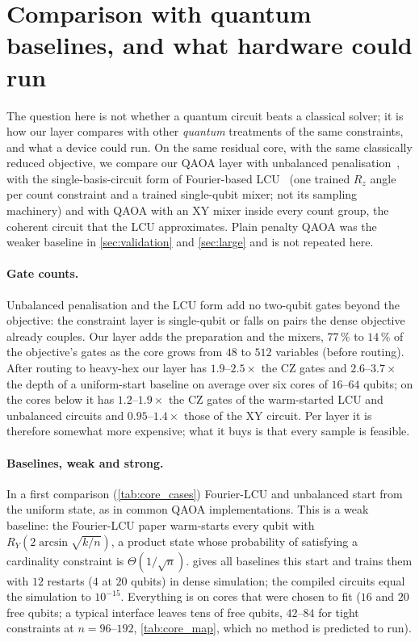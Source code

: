 \section{Comparison with quantum baselines, and what hardware could run}\label{sec:sota}
The question here is not whether a quantum circuit beats a classical solver; it is how our layer compares with other \emph{quantum} treatments of the same constraints, and what a device could run. On the same residual core, with the same classically reduced objective, we compare our QAOA layer with unbalanced penalisation~\cite{montanez2024unbalanced}, with the single-basis-circuit form of Fourier-based LCU~\cite{carrera2026fourier} (one trained $R_z$ angle per count constraint and a trained single-qubit mixer; not its sampling machinery) and with QAOA with an XY mixer inside every count group, the coherent circuit that the LCU approximates. Plain penalty QAOA was the weaker baseline in \cref{sec:validation} and \cref{sec:large} and is not repeated here.

\paragraph{Gate counts.} Unbalanced penalisation and the LCU form add no two-qubit gates beyond the objective: the constraint layer is single-qubit or falls on pairs the dense objective already couples. Our layer adds the preparation and the mixers, $77\,\%$ to $14\,\%$ of the objective's gates as the core grows from $48$ to $512$ variables (before routing). After routing to heavy-hex our layer has $1.9$--$2.5\times$ the CZ gates and $2.6$--$3.7\times$ the depth of a uniform-start baseline on average over six cores of $16$--$64$ qubits; on the cores below it has $1.2$--$1.9\times$ the CZ gates of the warm-started LCU and unbalanced circuits and $0.95$--$1.4\times$ those of the XY circuit. Per layer it is therefore somewhat more expensive; what it buys is that every sample is feasible.

\paragraph{Baselines, weak and strong.} In a first comparison (\cref{tab:core_cases}) Fourier-LCU and unbalanced start from the uniform state, as in common QAOA implementations. This is a weak baseline: the Fourier-LCU paper warm-starts every qubit with $R_Y(2\arcsin\sqrt{k/n})$, a product state whose probability of satisfying a cardinality constraint is $\Theta(1/\sqrt n)$.  gives all baselines this start and trains them with $12$ restarts ($4$ at $20$ qubits) in dense simulation; the compiled circuits equal the simulation to $10^{-15}$. Everything is on cores that were chosen to fit ($16$ and $20$ free qubits; a typical interface leaves tens of free qubits, $42$--$84$ for tight constraints at $n=96$--$192$, \cref{tab:core_map}, which no method is predicted to run).

